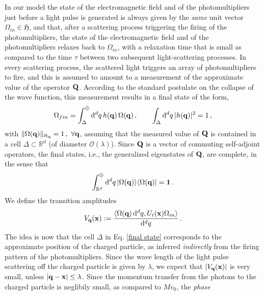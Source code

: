 \documentclass[12pt]{article}
\renewcommand{\d}{{\mathrm d}}
\begin{document}
In our model the state of the electromagnetic field and of the photomultipliers just before a light pulse is generated is 
always given by the \textit{same} unit vector $\Omega_{in} \in \mathfrak{H}$, and that, after a scattering process triggering the 
firing of the photomultipliers, the state of the electromagnetic field and of the photomultipliers relaxes back to $\Omega_{in}$, 
with a relaxation time that is small as compared to the time $\tau$ between two subsequent light-scattering processes. 
In every scattering process, the scattered light triggers an array of photomultipliers to fire, and this is assumed to amount 
to a measurement of the approximate value of the operator ${\bf{Q}}$. 
According to the standard postulate on the collapse of the wave function, this measurement results in a final state of the form, 
 \begin{equation}\label{final state}
 \Omega_{fin} = \int_{\Delta}^{\oplus} \d^{d}{q} \, h(\mathbf{q})\, \Omega({\bf{q}})\,,  \qquad \int_{\Delta} \d^{d}q\,\vert h(\mathbf{q})\vert^{2} =1\,,
 \end{equation}
with $ \Vert \Omega({\bf{q}}) \Vert_{\mathfrak{H}_{{\bf{q}}}} = 1\,, \,\,\forall {\bf{q}}$, assuming that the measured 
value of ${\bf{Q}}$ is contained in a cell $\Delta \subset \mathbb{R}^{d}$ (of diameter 
$\mathcal{O}(\lambda)$). Since ${\bf{Q}}$ is a vector of commuting self-adjoint operators, the final states, i.e., 
the generalized eigenstates of ${\bf{Q}}$, are complete, in the sense that
\begin{equation}\label{completeness-1}
\int_{\mathbb{R}^{d}}^{\oplus} \d^{d}q\, \vert \Omega({\bf{q}})\rangle \langle\Omega({\bf{q}})\vert  = {\bf{1}}\,.
\end{equation}
We define the transition amplitudes
\begin{equation}\label{trans ampl}
 V_{\bf{q}} (\mathbf{x}):= \frac{\langle \Omega({\bf{q}})\,\d^{d}{q}, U_{t}({\bf{x}}) \Omega_{in}\rangle}{\d^{d}{q}} \,.
 \end{equation}
The idea is now that the cell $\Delta$ in Eq. \eqref{final state} corresponds to the approximate position of the charged particle, as inferred \textit{indirectly} from the firing pattern of the photomultipliers. Since the wave length of the light pulse scattering off the charged particle is given by 
$\lambda$, we expect that $\vert V_{\bf{q}} ({\bf{x}}) \vert$ is very small, unless $\vert {\bf{q}}-{\bf{x}} \vert \leq \lambda$. Since the momentum transfer from the photons to the charged particle is neglibily small, as compared to $Mv_0$, the \textit{phase} 
\end{document}
